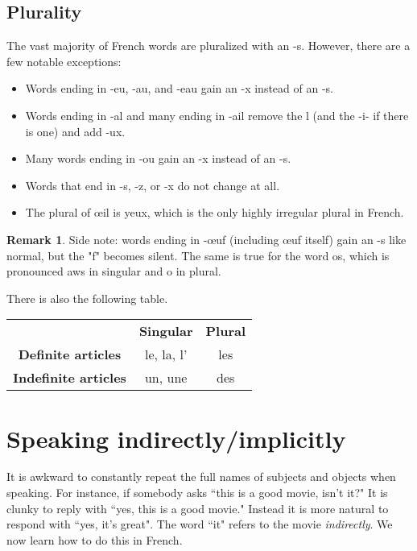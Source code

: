 \documentclass[12pt]{article}
\theoremstyle{plain}
\theoremstyle{definition}
\newtheorem{remark}[thm]{Remark}
\begin{document}
	\subsection{Plurality}
	The vast majority of French words are pluralized with an -s. However, there are a few notable exceptions: 
	\begin{itemize}
		\item Words ending in -eu, -au, and -eau gain an -x instead of an -s.
		\item Words ending in -al and many ending in -ail remove the l (and the -i- if there is one) and add -ux.
		\item Many words ending in -ou gain an -x instead of an -s.
		\item Words that end in -s, -z, or -x do not change at all.
		\item The plural of œil is yeux, which is the only highly irregular plural in French.
		\end{itemize}
	\begin{remark}
		Side note: words ending in -œuf (including œuf itself) gain an -s like normal, but the "f" becomes silent. The same is true for the word os, which is pronounced aws in singular and o in plural.
		\end{remark}
	
	There is also the following table.
	\begin{center}
		\begin{tabular}{| c c c |}
			\hline
			 & \textbf{Singular} & \textbf{Plural} \\
			\textbf{Definite articles} & le, la, l' & les\\
			\textbf{Indefinite articles} & un, une & des\\
			\hline
			\end{tabular}
		\end{center}
	
	\section{Speaking indirectly/implicitly}
	It is awkward to constantly repeat the full names of subjects and objects when speaking. For instance, if somebody asks ``this is a good movie, isn't it?" It is clunky to reply with ``yes, this is a good movie." Instead it is more natural to respond with ``yes, it's great". The word ``it" refers to the movie \emph{indirectly}. We now learn how to do this in French.
	
	
	
	
	
	
	
	
	
	
	
	
	
	
	
	
	
	
	
	
	
	
	
	
\end{document}
